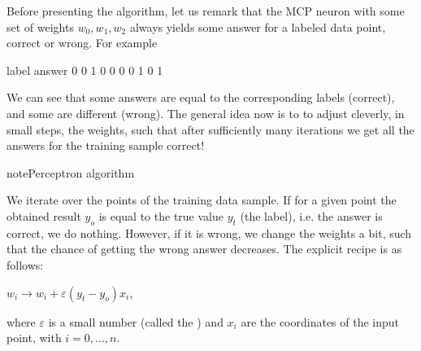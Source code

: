 \documentclass[a4paper,12pt,polish]{jupyterBook}
\begin{document}
\sphinxAtStartPar
Before presenting the algorithm, let us remark that the MCP neuron with some set of weights \(w_0, w_1, w_2\) always yields some answer for a labeled data point, correct or wrong. For example
\begin{sphinxVerbatimInput}

\begin{sphinxVerbatim}[commandchars=\\\{\}]
\PYG{p}{[}\PYG{p}{]}           

 

    
    \PYG{p}{[}\PYG{p}{]}\PYG{p}{[}\PYG{p}{]} 
\end{sphinxVerbatim}
\end{sphinxVerbatimInput}
\begin{sphinxVerbatimOutput}

\begin{sphinxVerbatim}[commandchars=\\\{\}]
label  answer
0      0
1      0
0      0
0      1
0      1
\end{sphinxVerbatim}
\end{sphinxVerbatimOutput}

\sphinxAtStartPar
We can see that some answers are equal to the corresponding labels (correct), and some are different (wrong). The general idea now is to  to adjust cleverly, in small steps, the weights, such that after sufficiently many iterations we get all the answers for the training sample correct!

\begin{sphinxadmonition}{note}{Perceptron algorithm}

\sphinxAtStartPar
We iterate over the points of the training data sample.
If for a given point  the obtained result \(y_o\) is equal to the true value \(y_t\) (the label), i.e. the answer is  correct, we do nothing. However, if it is wrong, we change the weights a bit, such that the chance of getting the wrong answer decreases. The explicit recipe is as follows:

\sphinxAtStartPar
\(w_i \to w_i  +  \varepsilon  (y_t - y_o)  x_i\),

\sphinxAtStartPar
where \( \varepsilon \) is a small number (called the ) and \(x_i\) are the coordinates of the input point, with \(i=0,\dots,n\).
\end{sphinxadmonition}
\end{document}
